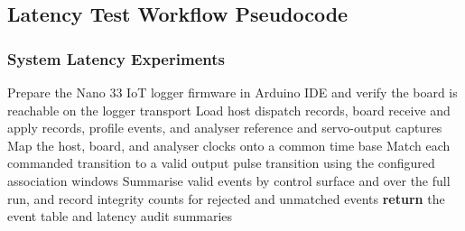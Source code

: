 \subsection{Latency Test Workflow Pseudocode}\label{sec:latency_workflow_pseudocode}

\vspace{0.20cm}

\LinesNumbered
\SetAlgoLined
\DontPrintSemicolon
{}
\SetAlCapSkip{0.50em}
\SetAlgoCaptionSeparator{\quad}

\subsubsection{System Latency Experiments}\label{sec:latency_system_pseudocode}

\vspace{0.30cm}

\begin{algorithm}[H]
\small
\setlength{\baselineskip}{1.15\baselineskip}
\caption{Arduino direct-servo end-to-end latency test}
\label{alg:latency_arduino_e2e}
Prepare the Nano 33 IoT logger firmware in Arduino IDE and verify the board is reachable on the logger transport\;
Load host dispatch records, board receive and apply records, profile events, and analyser reference and servo-output captures\;
Map the host, board, and analyser clocks onto a common time base\;
Match each commanded transition to a valid output pulse transition using the configured association windows\;
Summarise valid events by control surface and over the full run, and record integrity counts for rejected and unmatched events\;
\textbf{return} the event table and latency audit summaries\;
\end{algorithm}

